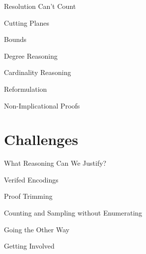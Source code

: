 \documentclass{beamer}
\begin{document}
\begin{frame}{Resolution Can't Count}
\end{frame}

\begin{frame}{Cutting Planes}
\end{frame}

\begin{frame}{Bounds}
\end{frame}

\begin{frame}{Degree Reasoning}
\end{frame}

\begin{frame}{Cardinality Reasoning}
\end{frame}

\begin{frame}{Reformulation}
\end{frame}

\begin{frame}{Non-Implicational Proofs}
\end{frame}

\section{Challenges}

\begin{frame}{What Reasoning Can We Justify?}
\end{frame}

\begin{frame}{Verifed Encodings}
\end{frame}

\begin{frame}{Proof Trimming}
\end{frame}

\begin{frame}{Counting and Sampling without Enumerating}
\end{frame}

\begin{frame}{Going the Other Way}
\end{frame}

\begin{frame}{Getting Involved}
\end{frame}
\end{document}
